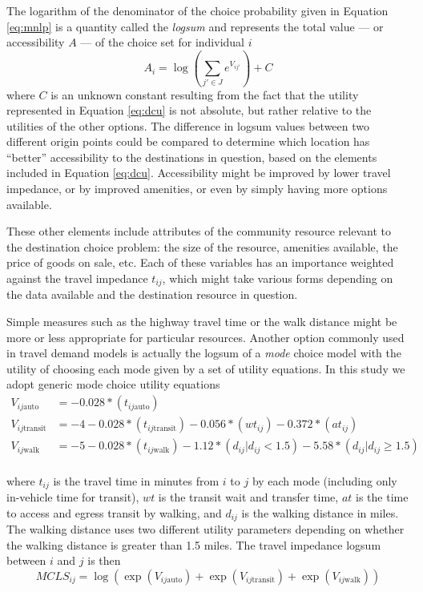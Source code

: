 \documentclass[ijerph,article,submit,moreauthors,pdftex]{mdpi}
\begin{document}
The logarithm of the denominator of the choice probability given in Equation
\eqref{eq:mnlp} is a quantity called the \emph{logsum} and represents the total
value --- or accessibility \(A\) --- of the choice set for individual \(i\)
\citep{williams1977formation, handy1997}
\begin{equation}
 A_i = \log\left(\sum_{j' \in J} e^{V_{ij'}}\right) + C
  \label{eq:dclogsum}
\end{equation}
where \(C\) is an unknown constant resulting from the fact that the utility
represented in Equation \eqref{eq:dcu} is not absolute, but rather relative to
the utilities of the other options. The difference in logsum values between two
different origin points could be compared to determine which location has ``better''
accessibility to the destinations in question, based on the elements included
in Equation \eqref{eq:dcu}. Accessibility might be improved by lower travel
impedance, or by improved amenities, or even by simply having more options available.

These other elements include attributes of the community resource relevant to
the destination choice problem: the size of the resource, amenities available,
the price of goods on sale, etc. Each of these variables has an
importance weighted against the travel impedance \(t_{ij}\), which might take
various forms depending on the data available and the destination resource in
question.

Simple measures such as the highway travel time or the walk distance
might be more or less appropriate for particular resources. Another option
commonly used in travel demand models is actually the logsum of a \emph{mode}
choice model with the utility of choosing each mode given by a set of utility
equations. In this study we adopt generic mode choice utility equations
\begin{align*}
  V_{ij\mathrm{auto}} &= -0.028* (t_{ij\mathrm{auto}})\\
  V_{ij\mathrm{transit}} &= -4 -0.028* (t_{ij\mathrm{transit}}) 
    -0.056* (wt_{ij}) -0.372*(at_{ij})\\
  V_{ij\mathrm{walk}} &= -5 -0.028* (t_{ij\mathrm{walk}}) 
    -1.12* (d_{ij} | d_{ij} < 1.5)  
    -5.58* (d_{ij} | d_{ij} \geq 1.5) 
\end{align*}\\
where \(t_{ij}\) is the travel time in minutes from \(i\) to \(j\) by each mode
(including only in-vehicle time for transit), \(wt\) is the transit wait and
transfer time, \(at\) is the time to access and egress transit by walking, and \(d_{ij}\)
is the walking distance in miles. The walking distance uses two different
utility parameters depending on whether the walking distance is greater than 1.5
miles. The travel impedance logsum between \(i\) and \(j\) is then
\begin{equation}
MCLS_{ij} = \log\left(\exp(V_{ij\mathrm{auto}}) + \exp(V_{ij\mathrm{transit}}) + \exp(V_{ij\mathrm{walk}}) \right)
  \label{eq:mcls}
\end{equation}
\end{document}
